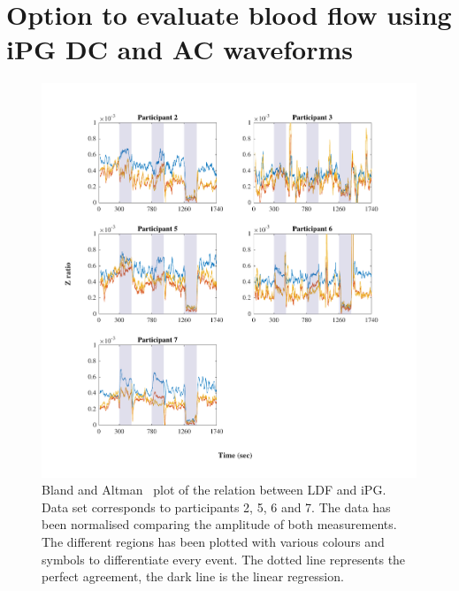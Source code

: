 \section{Option to evaluate blood flow using iPG DC and AC waveforms}  %
\label{section discussion 3}


\begin{figure}[!htpb]
	\includegraphics[width=1\textwidth,keepaspectratio]{figure1}    
	\caption[Bland and Altman plot of the relation between LDF and iPG]{Bland and Altman~\cite{bland1986statistical} plot of the relation between LDF and iPG. Data set corresponds to participants 2, 5, 6 and 7. The data has been normalised comparing the amplitude of both measurements. The different regions has been plotted with various colours and symbols to differentiate every event. The dotted line represents the perfect agreement, the dark line is the linear regression.}
	\label{fig:ratio Z}
\end{figure}

